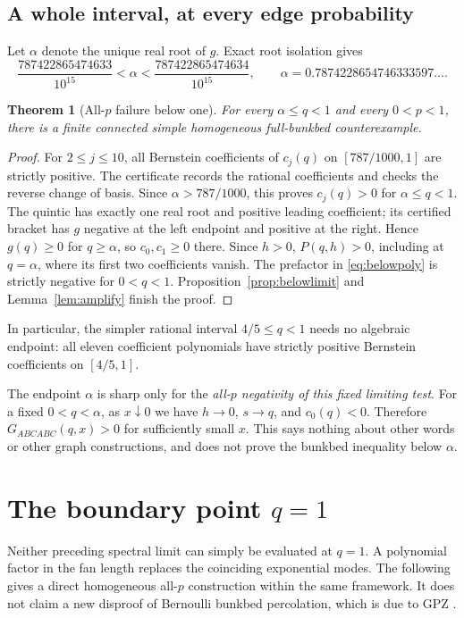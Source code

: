 \documentclass[11pt,a4paper]{article}
\newtheorem{theorem}{Theorem}[section]
\theoremstyle{remark}\newtheorem{remark}[theorem]{Remark}
\begin{document}
\subsection{A whole interval, at every edge probability}
Let $\alpha$ denote the unique real root of $g$. Exact root isolation gives
\begin{equation}\label{eq:alpha}
\frac{787422865474633}{10^{15}}<\alpha<
\frac{787422865474634}{10^{15}},
\qquad \alpha=0.7874228654746333597\ldots.
\end{equation}
\begin{theorem}[All-$p$ failure below one]\label{thm:below}
For every $\alpha\le q<1$ and every $0<p<1$, there is a finite connected simple homogeneous full-bunkbed counterexample.
\end{theorem}
\begin{proof}
For $2\le j\le10$, all Bernstein coefficients of $c_j(q)$ on $[787/1000,1]$ are strictly positive. The certificate records the rational coefficients and checks the reverse change of basis. Since $\alpha>787/1000$, this proves $c_j(q)>0$ for $\alpha\le q<1$.
The quintic has exactly one real root and positive leading coefficient; its certified bracket has $g$ negative at the left endpoint and positive at the right. Hence $g(q)\ge0$ for $q\ge\alpha$, so $c_0,c_1\ge0$ there. Since $h>0$, $P(q,h)>0$, including at $q=\alpha$, where its first two coefficients vanish. The prefactor in \eqref{eq:belowpoly} is strictly negative for $0<q<1$. Proposition~\ref{prop:belowlimit} and Lemma~\ref{lem:amplify} finish the proof.
\end{proof}
In particular, the simpler rational interval $4/5\le q<1$ needs no algebraic endpoint: all eleven coefficient polynomials have strictly positive Bernstein coefficients on $[4/5,1]$.

The endpoint $\alpha$ is sharp only for the \emph{all-$p$ negativity of this fixed limiting test}. For a fixed $0<q<\alpha$, as $x\downarrow0$ we have $h\to0$, $s\to q$, and $c_0(q)<0$. Therefore $G_{ABCABC}(q,x)>0$ for sufficiently small $x$. This says nothing about other words or other graph constructions, and does not prove the bunkbed inequality below $\alpha$.
\section{The boundary point $q=1$}\label{sec:percolation}
Neither preceding spectral limit can simply be evaluated at $q=1$. A polynomial factor in the fan length replaces the coinciding exponential modes. The following gives a direct homogeneous all-$p$ construction within the same framework. It does not claim a new disproof of Bernoulli bunkbed percolation, which is due to GPZ \cite{GPZ}.
\end{document}
